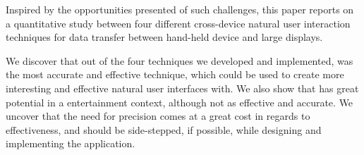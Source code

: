 Inspired by the opportunities presented of such challenges, this paper reports on a quantitative study between four different cross-device natural user interaction techniques for data transfer between hand-held device and large displays.

We discover that out of the four techniques we developed and implemented, \swipe was the most accurate and effective technique, which could be used to create more interesting and effective natural user interfaces with. We also show that \pinch has great potential in a entertainment context, although not as effective and accurate. We uncover that the need for precision comes at a great cost in regards to effectiveness, and should be side-stepped, if possible, while designing and implementing the application.  

